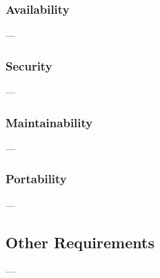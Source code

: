 \documentclass{article}
\begin{document}
\subsubsection{Availability} 
---
\subsubsection{Security}
---
\subsubsection{Maintainability}
---
\subsubsection{Portability}
---
\subsection{Other Requirements}
---
\end{document}
